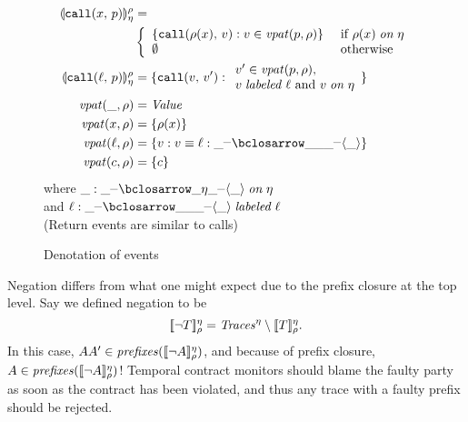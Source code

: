 \begin{figure}
  \begin{align*}
    \denoteevent{\scallev{\mvar}{\mvpat}}{\mtimeline}{\menv} &= \\
    &\left\{\begin{array}{ll}
           \setbuild{\apvcall{\menv(\mvar)}{\mval}}{\mval \in \vpatToData(\mvpat, \menv)} &\text{ if } \timelineis{\menv(\mvar)}{\mtimeline} \\
           \emptyset & \text{ otherwise}
           \end{array}\right.
\\
    \denoteevent{\scallev{\mtoplevelname}{\mvpat}}{\mtimeline}{\menv} &=
      \setbuild{\apvcall{\mval}{\mval'}}{
        \begin{array}{l}
\mval' \in \vpatToData(\mvpat, \menv),\\
 \labelis{\mval}{\mtoplevelname} \text{ and } \timelineis{\mval}{\mtimeline}
\end{array}
}
\\
   \vpatToData(\swc, \menv) &= \Value
\\
   \vpatToData(\mvar, \menv) &= \setof{\menv(\mvar)}
\\
   \vpatToData(\mtoplevelname, \menv) &= \setbuild{\mval}{\mval \equiv \bclos{\mtoplevelname}{\swc}{\swc}{\swc}{\swc}{\swc}{\swc}{\swc}}
\\
   \vpatToData(\mconstant, \menv) &= \setof{\mconstant}
  \end{align*}
  where $\timelineis{\bclos{\swc}{\swc}{\swc}{\swc}{\mtimeline}{\swc}{\swc}{\swc}}{\mtimeline}$ \\
  and $\labelis{\bclos{\mtoplevelname}{\swc}{\swc}{\swc}{\swc}{\swc}{\swc}{\swc}}{\mtoplevelname}$ \\
  (Return events are similar to calls)
  \caption{Denotation of events}
  \label{fig:event-denotation}
\end{figure}

Negation differs from what one might expect due to the prefix closure at the top level.
%
Say we defined negation to be
\begin{equation*}
  [\![ \neg T ]\!]^{\eta}_{\rho} = \mathit{Traces}^\eta \setminus [\![ T ]\!]^{\eta}_{\rho}\text.
\end{equation*}
In this case, $AA' \in \mathit{prefixes}([\![ \neg A ]\!]^{\eta}_{\rho})$, and because of prefix closure, $A \in \mathit{prefixes}([\![ \neg A ]\!]^{\eta}_{\rho})$!
%
Temporal contract monitors should blame the faulty party as soon as the contract has been violated, and thus any trace with a faulty prefix should be rejected.

